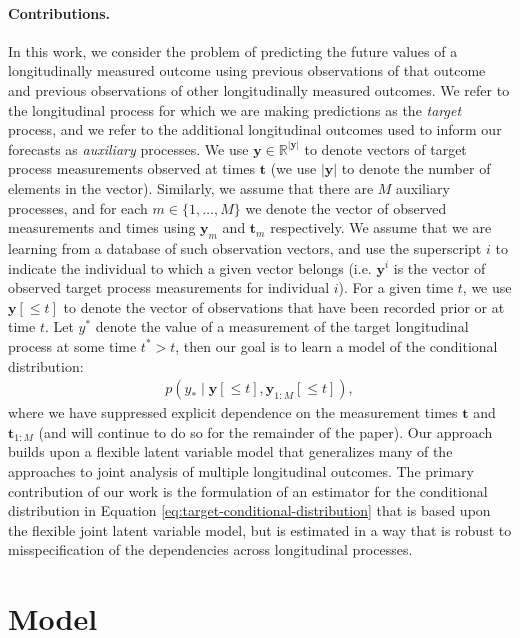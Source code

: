 \documentclass[12pt]{article}
\newcommand{\given}{\mid}
\newcommand{\R}{\mathbb{R}}
\begin{document}
\paragraph{Contributions.}
In this work, we consider the problem of predicting the future values of a longitudinally measured outcome using previous observations of that outcome and previous observations of other longitudinally measured outcomes. We refer to the longitudinal process for which we are making predictions as the \emph{target} process, and we refer to the additional longitudinal outcomes used to inform our forecasts as \emph{auxiliary} processes. We use $\bm{y} \in \R^{|\bm{y}|}$ to denote vectors of target process measurements observed at times $\bm{t}$ (we use $|\bm{y}|$ to denote the number of elements in the vector). Similarly, we assume that there are $M$ auxiliary processes, and for each $m \in \{1, \ldots, M\}$ we denote the vector of observed measurements and times using $\bm{y}_m$ and $\bm{t}_m$ respectively. We assume that we are learning from a database of such observation vectors, and use the superscript $i$ to indicate the individual to which a given vector belongs (i.e. $\bm{y}^i$ is the vector of observed target process measurements for individual $i$). For a given time $t$, we use $\bm{y}[\le t]$ to denote the vector of observations that have been recorded prior or at time $t$. Let $y^*$ denote the value of a measurement of the target longitudinal process at some time $t^* > t$, then our goal is to learn a model of the conditional distribution:
\begin{align}
\label{eq:target-conditional-distribution}
p(y_* \given \bm{y}[\le t], \bm{y}_{1:M}[\le t]),
\end{align}
where we have suppressed explicit dependence on the measurement times $\bm{t}$ and $\bm{t}_{1:M}$ (and will continue to do so for the remainder of the paper). Our approach builds upon a flexible latent variable model that generalizes many of the approaches to joint analysis of multiple longitudinal outcomes. The primary contribution of our work is the formulation of an estimator for the conditional distribution in Equation \ref{eq:target-conditional-distribution} that is based upon the flexible joint latent variable model, but is estimated in a way that is robust to misspecification of the dependencies across longitudinal processes.


\section{Model}
\end{document}
